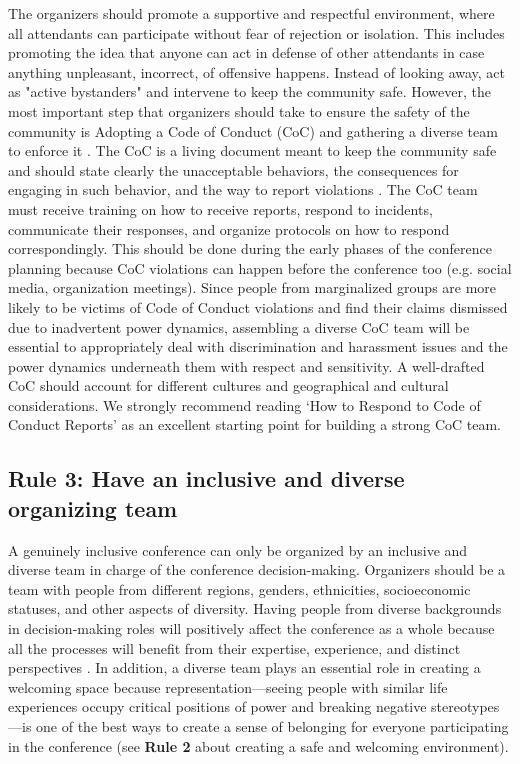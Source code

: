 \documentclass[10pt,letterpaper]{article}
\begin{document}
The organizers should promote a supportive and respectful environment, where all attendants can participate without fear of rejection or isolation. This includes promoting the idea that anyone can act in defense of other attendants in case anything unpleasant, incorrect, of offensive happens. Instead of looking away, act as "active bystanders" and intervene to keep the community safe.
However, the most important step that organizers should take to ensure the safety of the community is
Adopting a Code of Conduct (CoC) and gathering a diverse team to enforce it \cite{favaroYourScienceConference2016}.
The CoC is a living document meant to keep the community safe and should state clearly the unacceptable behaviors, the consequences for engaging in such behavior, and the way to report violations \cite{auroraHowRespondCode2019}. 
The CoC team must receive training on how to receive reports, respond to incidents, communicate their responses, and organize protocols on how to respond correspondingly. This should be done during the early phases of the conference planning because CoC violations can happen before the conference too (e.g. social media, organization meetings).  
Since people from marginalized groups are more likely to be victims of Code of Conduct violations and find their claims dismissed due to inadvertent power dynamics, assembling a diverse CoC team will be essential to appropriately deal with discrimination and harassment issues and the power dynamics underneath them with respect and sensitivity. A well-drafted CoC should account for  different cultures and geographical and cultural considerations. 
We strongly recommend reading `How to Respond to Code of Conduct Reports' \cite{auroraHowRespondCode2019} as an excellent starting point for building a strong CoC team.
 


\subsection*{Rule 3: Have an inclusive and diverse organizing team}
\label{rule_organizing_team}


A genuinely inclusive conference can only be organized by an inclusive and diverse team in charge of the conference decision-making.
Organizers should be a team with people from different regions, genders, ethnicities, socioeconomic statuses, and other aspects of diversity.
Having people from diverse backgrounds in decision-making roles will positively affect the conference as a whole because all the processes will benefit from their expertise, experience, and distinct perspectives \cite{hongGroupsDiverseProblem2004}. 
In addition, a diverse team plays an essential role in creating a welcoming space because representation—seeing people with similar life experiences occupy critical positions of power and breaking negative stereotypes—is one of the best ways to create a sense of belonging for everyone participating in the conference (see \textbf{Rule 2} about creating a safe and welcoming environment).
\end{document}
